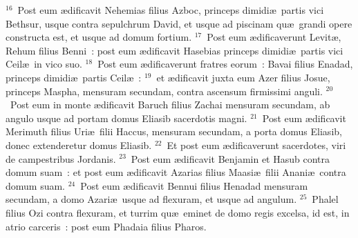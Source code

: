 ${}^{16}$~Post eum \ae dificavit Nehemias filius Azboc, princeps dimidi\ae\ partis vici Bethsur, usque contra sepulchrum David, et usque ad piscinam qu\ae\ grandi opere constructa est, et usque ad domum fortium.
${}^{17}$~Post eum \ae dificaverunt Levit\ae , Rehum filius Benni~: post eum \ae dificavit Hasebias princeps dimidi\ae\ partis vici Ceil\ae\ in vico suo.
${}^{18}$~Post eum \ae dificaverunt fratres eorum~: Bavai filius Enadad, princeps dimidi\ae\ partis Ceil\ae~:
${}^{19}$~et \ae dificavit juxta eum Azer filius Josue, princeps Maspha, mensuram secundam, contra ascensum firmissimi anguli.
${}^{20}$~Post eum in monte \ae dificavit Baruch filius Zachai mensuram secundam, ab angulo usque ad portam domus Eliasib sacerdotis magni.
${}^{21}$~Post eum \ae dificavit Merimuth filius Uri\ae\ filii Haccus, mensuram secundam, a porta domus Eliasib, donec extenderetur domus Eliasib.
${}^{22}$~Et post eum \ae dificaverunt sacerdotes, viri de campestribus Jordanis.
${}^{23}$~Post eum \ae dificavit Benjamin et Hasub contra domum suam~: et post eum \ae dificavit Azarias filius Maasi\ae\ filii Anani\ae\ contra domum suam.
${}^{24}$~Post eum \ae dificavit Bennui filius Henadad mensuram secundam, a domo Azari\ae\ usque ad flexuram, et usque ad angulum.
${}^{25}$~Phalel filius Ozi contra flexuram, et turrim qu\ae\ eminet de domo regis excelsa, id est, in atrio carceris~: post eum Phadaia filius Pharos.


